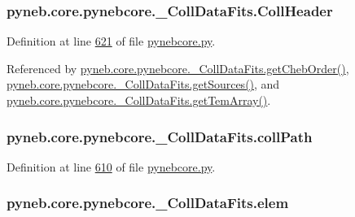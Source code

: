\subsubsection[{Coll\+Header}]{\setlength{\rightskip}{0pt plus 5cm}pyneb.\+core.\+pynebcore.\+\_\+\+Coll\+Data\+Fits.\+Coll\+Header}\label{classpyneb_1_1core_1_1pynebcore_1_1___coll_data_fits_ac869d4a1a70ad7d42881b0e19a69ab4c}


Definition at line \hyperlink{pynebcore_8py_source_l00621}{621} of file \hyperlink{pynebcore_8py_source}{pynebcore.\+py}.



Referenced by \hyperlink{pynebcore_8py_source_l00694}{pyneb.\+core.\+pynebcore.\+\_\+\+Coll\+Data\+Fits.\+get\+Cheb\+Order()}, \hyperlink{pynebcore_8py_source_l00673}{pyneb.\+core.\+pynebcore.\+\_\+\+Coll\+Data\+Fits.\+get\+Sources()}, and \hyperlink{pynebcore_8py_source_l00880}{pyneb.\+core.\+pynebcore.\+\_\+\+Coll\+Data\+Fits.\+get\+Tem\+Array()}.

\hypertarget{classpyneb_1_1core_1_1pynebcore_1_1___coll_data_fits_ad08da92d019bbc87139f04fb7d765411}{}
\subsubsection[{coll\+Path}]{\setlength{\rightskip}{0pt plus 5cm}pyneb.\+core.\+pynebcore.\+\_\+\+Coll\+Data\+Fits.\+coll\+Path}\label{classpyneb_1_1core_1_1pynebcore_1_1___coll_data_fits_ad08da92d019bbc87139f04fb7d765411}


Definition at line \hyperlink{pynebcore_8py_source_l00610}{610} of file \hyperlink{pynebcore_8py_source}{pynebcore.\+py}.

\hypertarget{classpyneb_1_1core_1_1pynebcore_1_1___coll_data_fits_ac34163e88a48564f05f1cf5aa8d4683a}{}
\subsubsection[{elem}]{\setlength{\rightskip}{0pt plus 5cm}pyneb.\+core.\+pynebcore.\+\_\+\+Coll\+Data\+Fits.\+elem}\label{classpyneb_1_1core_1_1pynebcore_1_1___coll_data_fits_ac34163e88a48564f05f1cf5aa8d4683a}


